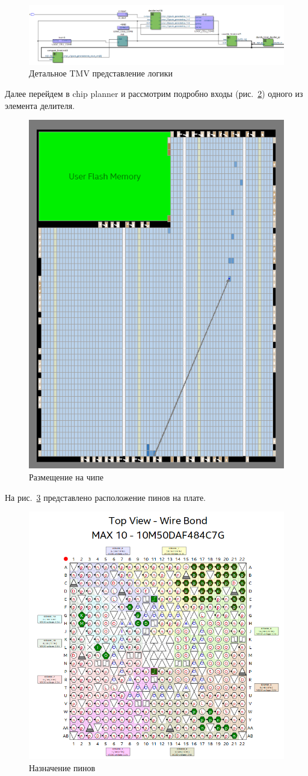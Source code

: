 \documentclass[a4paper,14pt]{article}
\begin{document}
\begin{figure}[H]
	\centering
	\includegraphics[width=\linewidth]{image/tmv_2}
	\caption{Детальное TMV представление логики}
	\label{fig:tmv_2}
\end{figure}

Далее перейдем в chip planner и рассмотрим подробно входы (рис.~\ref{fig:chip}) одного из элемента делителя.

\begin{figure}[H]
	\centering
	\includegraphics[width=0.5\linewidth]{image/chip}
	\caption{Размещение на чипе}
	\label{fig:chip}
\end{figure}

На рис.~\ref{fig:pins} представлено расположение пинов на плате.

\begin{figure}[H]
	\centering
	\includegraphics[width=0.8\linewidth]{image/pins}
	\caption{Назначение пинов}
	\label{fig:pins}
\end{figure}
\end{document}

